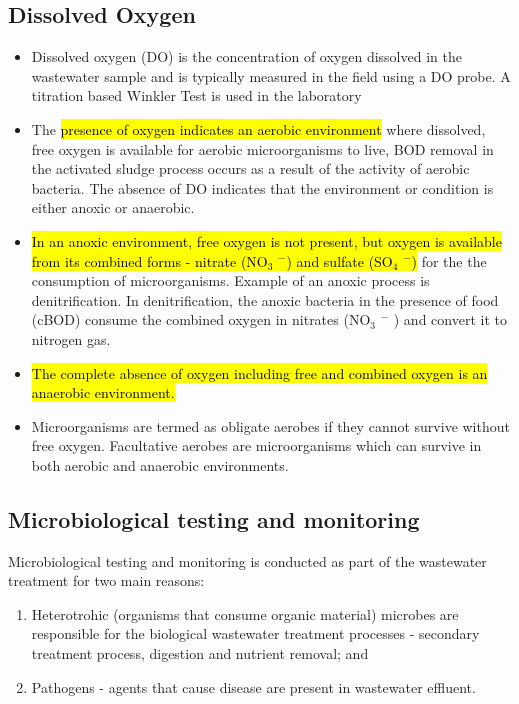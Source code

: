 \subsection{Dissolved Oxygen}	
			\begin{itemize}
				\item Dissolved oxygen (DO) is the concentration of oxygen dissolved in the wastewater sample and is typically measured in the field using a DO probe.  A titration based Winkler Test is used in the laboratory
				\item The \hl{presence of oxygen indicates an aerobic environment} where dissolved, free oxygen is available for aerobic microorganisms to live, BOD removal in the activated sludge process occurs as a result of the activity of aerobic bacteria.  The absence of DO indicates that the environment or condition is either anoxic or anaerobic.  
				\item \hl{In an anoxic environment, free oxygen is not present, but oxygen is available from its combined  forms - nitrate (NO$_3$ $^-$) and sulfate (SO$_4$ $^-$)} for the the consumption of microorganisms.  Example of an anoxic process is denitrification.  In denitrification, the anoxic bacteria in the presence of food (cBOD) consume the combined oxygen in nitrates (NO$_3$ $^-$ ) and convert it to nitrogen gas.
				\item \hl{The complete absence of oxygen including free and combined oxygen is an anaerobic environment.}
				\item Microorganisms are termed as obligate aerobes if they cannot survive without free oxygen.  Facultative aerobes are microorganisms which can survive in both aerobic and anaerobic environments.  
			\end{itemize}
			
\subsection{Microbiological testing and monitoring}	
			
			Microbiological testing and monitoring is conducted as part of the wastewater treatment for two main reasons:
			\begin{enumerate}[1.]
				\item Heterotrohic (organisms that consume organic material) microbes are responsible for the biological wastewater treatment processes - secondary treatment process, digestion and nutrient removal; and
				\item Pathogens - agents that cause disease are present in wastewater effluent.
			\end{enumerate}

